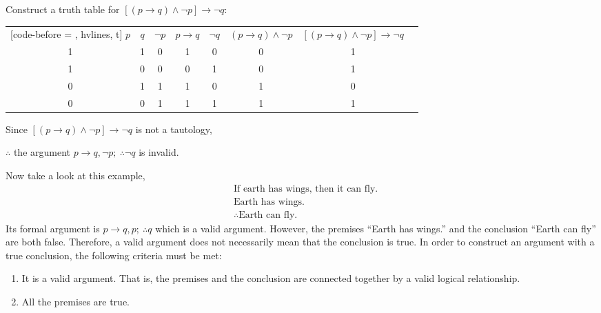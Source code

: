 \documentclass{report}
\newcounter{example}
\begin{document}
\begin{solution}
    \item Construct a truth table for $[(p \rightarrow q) \land \neg p] \rightarrow \neg
        q$:
    \begin{center}
        \begin{NiceTabular}{|c|c|c|c|c|c|c|c|}[code-before = , hvlines, t]
            $p$ & $q$ & $\neg p$ & $p \rightarrow q$ & $\neg q$ & $(p \rightarrow q) \land \neg p$ & $[(p \rightarrow q) \land \neg p] \rightarrow \neg q$ \\
            1   & 1   & 0        & 1                 & 0        & 0                                & 1                                                     \\
            1   & 0   & 0        & 0                 & 1        & 0                                & 1                                                     \\
            0   & 1   & 1        & 1                 & 0        & 1                                & 0                                                     \\
            0   & 0   & 1        & 1                 & 1        & 1                                & 1                                                     \\
        \end{NiceTabular}
    \end{center}
    Since $[(p \rightarrow q) \land \neg p] \rightarrow \neg q$ is not a tautology,

    $\therefore$ the argument $p \rightarrow q, \neg p;\ \therefore \neg q$ is invalid.
\end{solution}

Now take a look at this example,
\begin{align*}
     & \text{If earth has wings, then it can fly.} \\
     & \text{Earth has wings.}                     \\
     & \therefore \text{Earth can fly.}
\end{align*}
Its formal argument is $p \rightarrow q, p;\ \therefore q$ which is a valid argument. However, the premises ``Earth has wings.'' and the conclusion ``Earth can fly'' are both false. Therefore, a valid argument does not necessarily mean that the conclusion is true. In order to construct an argument with a true conclusion, the following criteria must be met:
\begin{enumerate}
    \item It is a valid argument. That is, the premises and the conclusion are connected
          together by a valid logical relationship.
    \item All the premises are true.
\end{enumerate}
\end{document}
